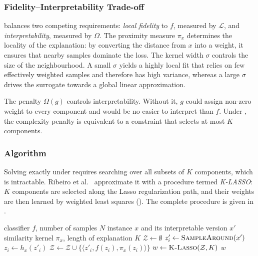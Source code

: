     \subsubsection{Fidelity--Interpretability Trade-off}
     balances two competing requirements: \textit{local fidelity} to $f$, measured by $\mathcal{L}$, and \textit{interpretability}, measured by $\Omega$. The proximity measure $\pi_x$ determines the locality of the explanation: by converting the distance from $x$ into a weight, it ensures that nearby samples dominate the loss. The kernel width $\sigma$ controls the size of the neighbourhood. A small $\sigma$ yields a highly local fit that relies on few effectively weighted samples and therefore has high variance, whereas a large $\sigma$ drives the surrogate towards a global linear approximation.

    The penalty $\Omega(g)$ controls interpretability. Without it, $g$ could assign non-zero weight to every component and would be no easier to interpret than $f$. Under , the complexity penalty is equivalent to a constraint that selects at most $K$ components.

    \subsubsection{Algorithm}
    Solving  exactly under  requires searching over all subsets of $K$ components, which is intractable. Ribeiro et al.~\cite{ribeiro-etal-2016-trust} approximate it with a procedure termed \textit{K-LASSO}: $K$ components are selected along the Lasso regularization path, and their weights are then learned by weighted least squares (). The complete procedure is given in .

    \begin{algorithm}[tb]
        \caption{Sparse linear explanations using LIME, adapted from~\cite{ribeiro-etal-2016-trust}.}
        \label{alg:lime}
        \small
        \begin{algorithmic}[1]
            \Require classifier $f$, number of samples $N$
            \Require instance $x$ and its interpretable version $x'$
            \Require similarity kernel $\pi_x$, length of explanation $K$
            \State $\mathcal{Z} \gets \emptyset$
                \State $z'_i \gets \textsc{SampleAround}(x')$
                \State $z_i \gets h_x(z'_i)$
                \State $\mathcal{Z} \gets \mathcal{Z} \cup \{\langle z'_i, f(z_i), \pi_x(z_i) \rangle\}$
            \EndFor
            \State $w \gets \textsc{K-Lasso}(\mathcal{Z}, K)$
            \Statex {}
            \State \Return $w$
        \end{algorithmic}
    \end{algorithm}

